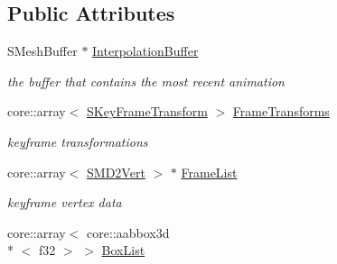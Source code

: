 \subsection*{Public Attributes}
\begin{DoxyCompactItemize}
\item 
\hypertarget{classirr_1_1scene_1_1_c_animated_mesh_m_d2_a9b3814e3d46594145fec9450a7de325f}{S\-Mesh\-Buffer $\ast$ \hyperlink{classirr_1_1scene_1_1_c_animated_mesh_m_d2_a9b3814e3d46594145fec9450a7de325f}{Interpolation\-Buffer}}\label{classirr_1_1scene_1_1_c_animated_mesh_m_d2_a9b3814e3d46594145fec9450a7de325f}

\begin{DoxyCompactList}\small\item\em the buffer that contains the most recent animation \end{DoxyCompactList}\item 
\hypertarget{classirr_1_1scene_1_1_c_animated_mesh_m_d2_a9623ed9472b02940c7d241fc3c5949ce}{core\-::array$<$ \hyperlink{structirr_1_1scene_1_1_c_animated_mesh_m_d2_1_1_s_key_frame_transform}{S\-Key\-Frame\-Transform} $>$ \hyperlink{classirr_1_1scene_1_1_c_animated_mesh_m_d2_a9623ed9472b02940c7d241fc3c5949ce}{Frame\-Transforms}}\label{classirr_1_1scene_1_1_c_animated_mesh_m_d2_a9623ed9472b02940c7d241fc3c5949ce}

\begin{DoxyCompactList}\small\item\em keyframe transformations \end{DoxyCompactList}\item 
\hypertarget{classirr_1_1scene_1_1_c_animated_mesh_m_d2_aa10502b51b0577da62cccca6781aa9d9}{core\-::array$<$ \hyperlink{structirr_1_1scene_1_1_c_animated_mesh_m_d2_1_1_s_m_d2_vert}{S\-M\-D2\-Vert} $>$ $\ast$ \hyperlink{classirr_1_1scene_1_1_c_animated_mesh_m_d2_aa10502b51b0577da62cccca6781aa9d9}{Frame\-List}}\label{classirr_1_1scene_1_1_c_animated_mesh_m_d2_aa10502b51b0577da62cccca6781aa9d9}

\begin{DoxyCompactList}\small\item\em keyframe vertex data \end{DoxyCompactList}\item 
\hypertarget{classirr_1_1scene_1_1_c_animated_mesh_m_d2_a9ee7c815e80a44de612a25e66d4022b5}{core\-::array$<$ core\-::aabbox3d\\*
$<$ f32 $>$ $>$ \hyperlink{classirr_1_1scene_1_1_c_animated_mesh_m_d2_a9ee7c815e80a44de612a25e66d4022b5}{Box\-List}}\label{classirr_1_1scene_1_1_c_animated_mesh_m_d2_a9ee7c815e80a44de612a25e66d4022b5}


\end{DoxyCompactItemize}
